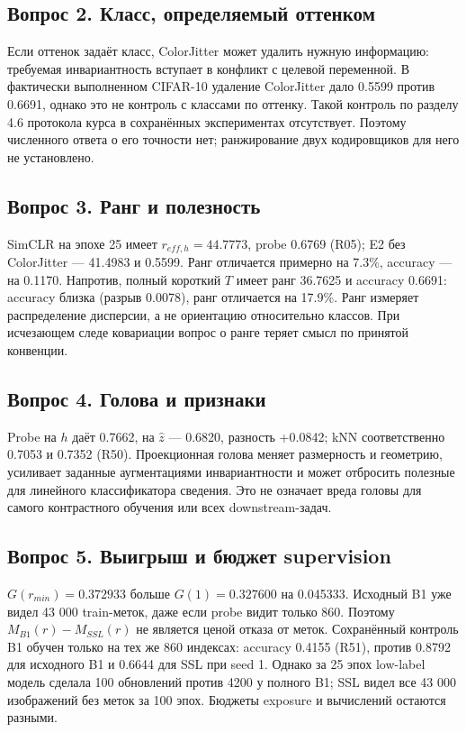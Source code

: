 \subsection*{Вопрос 2. Класс, определяемый оттенком}
Если оттенок задаёт класс, ColorJitter может удалить нужную информацию: требуемая инвариантность вступает в конфликт с целевой переменной. В фактически выполненном CIFAR-10 удаление ColorJitter дало 0.5599 против 0.6691, однако это не контроль с классами по оттенку. Такой контроль по разделу 4.6 протокола курса в сохранённых экспериментах отсутствует. Поэтому численного ответа о его точности нет; ранжирование двух кодировщиков для него не установлено.
\subsection*{Вопрос 3. Ранг и полезность}
SimCLR на эпохе 25 имеет $r_{eff,h}=44.7773$, probe 0.6769 (R05); E2 без ColorJitter --- 41.4983 и 0.5599. Ранг отличается примерно на 7.3\%, accuracy --- на 0.1170. Напротив, полный короткий $T$ имеет ранг 36.7625 и accuracy 0.6691: accuracy близка (разрыв 0.0078), ранг отличается на 17.9\%. Ранг измеряет распределение дисперсии, а не ориентацию относительно классов. При исчезающем следе ковариации вопрос о ранге теряет смысл по принятой конвенции.
\subsection*{Вопрос 4. Голова и признаки}
Probe на $h$ даёт 0.7662, на $\hat z$ --- 0.6820, разность +0.0842; kNN соответственно 0.7053 и 0.7352 (R50). Проекционная голова меняет размерность и геометрию, усиливает заданные аугментациями инвариантности и может отбросить полезные для линейного классификатора сведения. Это не означает вреда головы для самого контрастного обучения или всех downstream-задач.
\subsection*{Вопрос 5. Выигрыш и бюджет supervision}
$G(r_{min})=0.372933$ больше $G(1)=0.327600$ на 0.045333. Исходный B1 уже видел 43 000 train-меток, даже если probe видит только 860. Поэтому $M_{B1}(r)-M_{SSL}(r)$ не является ценой отказа от меток. Сохранённый контроль B1 обучен только на тех же 860 индексах: accuracy 0.4155 (R51), против 0.8792 для исходного B1 и 0.6644 для SSL при seed 1. Однако за 25 эпох low-label модель сделала 100 обновлений против 4200 у полного B1; SSL видел все 43 000 изображений без меток за 100 эпох. Бюджеты exposure и вычислений остаются разными.

